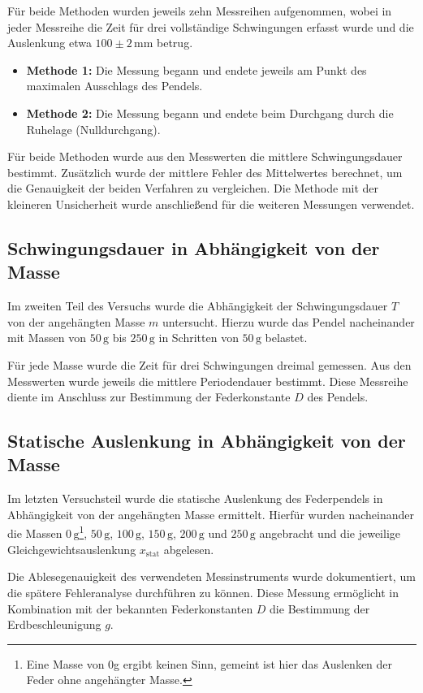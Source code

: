 Für beide Methoden wurden jeweils zehn Messreihen aufgenommen, wobei in jeder Messreihe die Zeit für drei vollständige Schwingungen erfasst wurde und die Auslenkung etwa $100\pm 2 \, \mathrm{mm}$ betrug. 

\begin{itemize}
    \item \textbf{Methode 1:} Die Messung begann und endete jeweils am Punkt des maximalen Ausschlags des Pendels.  
    \item \textbf{Methode 2:} Die Messung begann und endete beim Durchgang durch die Ruhelage (Nulldurchgang).  
\end{itemize}

Für beide Methoden wurde aus den Messwerten die mittlere Schwingungsdauer bestimmt. Zusätzlich wurde der mittlere Fehler des Mittelwertes berechnet, um die Genauigkeit der beiden Verfahren zu vergleichen. Die Methode mit der kleineren Unsicherheit wurde anschließend für die weiteren Messungen verwendet.  

\subsection*{Schwingungsdauer in Abhängigkeit von der Masse}
Im zweiten Teil des Versuchs wurde die Abhängigkeit der Schwingungsdauer $T$ von der angehängten Masse $m$ untersucht. Hierzu wurde das Pendel nacheinander mit Massen von $50\,\mathrm{g}$ bis $250\,\mathrm{g}$ in Schritten von $50\,\mathrm{g}$ belastet.  

Für jede Masse wurde die Zeit für drei Schwingungen dreimal gemessen. Aus den Messwerten wurde jeweils die mittlere Periodendauer bestimmt. Diese Messreihe diente im Anschluss zur Bestimmung der Federkonstante $D$ des Pendels.  

\subsection*{Statische Auslenkung in Abhängigkeit von der Masse}
Im letzten Versuchsteil wurde die statische Auslenkung des Federpendels in Abhängigkeit von der angehängten Masse ermittelt. Hierfür wurden nacheinander die Massen $0\,\mathrm{g}$\footnote{Eine Masse von 0g ergibt keinen Sinn, gemeint ist hier das Auslenken der Feder ohne angehängter Masse.}, $50\,\mathrm{g}$, $100\,\mathrm{g}$, $150\,\mathrm{g}$, $200\,\mathrm{g}$ und $250\,\mathrm{g}$ angebracht und die jeweilige Gleichgewichtsauslenkung $x_\text{stat}$ abgelesen.  

Die Ablesegenauigkeit des verwendeten Messinstruments wurde dokumentiert, um die spätere Fehleranalyse durchführen zu können. Diese Messung ermöglicht in Kombination mit der bekannten Federkonstanten $D$ die Bestimmung der Erdbeschleunigung $g$.  